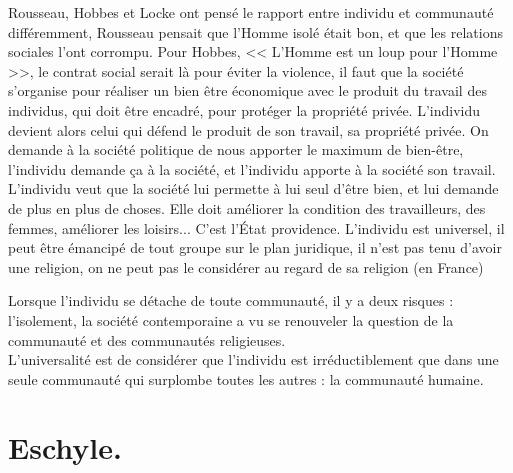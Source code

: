 \documentclass[11pt]{article}
\begin{document}
Rousseau, Hobbes et Locke ont pensé le rapport entre individu et communauté différemment, Rousseau pensait que l'Homme isolé était bon, et que les relations sociales l'ont corrompu. Pour Hobbes, << L'Homme est un loup pour l'Homme >>, le contrat social serait là pour éviter la violence, il faut que la société s'organise pour réaliser un bien être économique avec le produit du travail des individus, qui doit être encadré, pour protéger la propriété privée. L'individu devient alors celui qui défend le produit de son travail, sa propriété privée. On demande à la société politique de nous apporter le maximum de bien-être, l'individu demande ça à la société, et l'individu apporte à la société son travail.
L'individu veut que la société lui permette à lui seul d'être bien, et lui demande de plus en plus de choses. Elle doit améliorer la condition des travailleurs, des femmes, améliorer les loisirs... C'est l'État providence. L'individu est universel, il peut être émancipé de tout groupe sur le plan juridique, il n'est pas tenu d'avoir une religion, on ne peut pas le considérer au regard de sa religion (en France) 

Lorsque l'individu se détache de toute communauté, il y a deux risques : l'isolement, la société contemporaine a vu se renouveler la question de la communauté et des communautés religieuses.\\
L'universalité est de considérer que l'individu est irréductiblement que dans une seule communauté qui surplombe toutes les autres : la communauté humaine. 


\section{Eschyle.}
\end{document}
